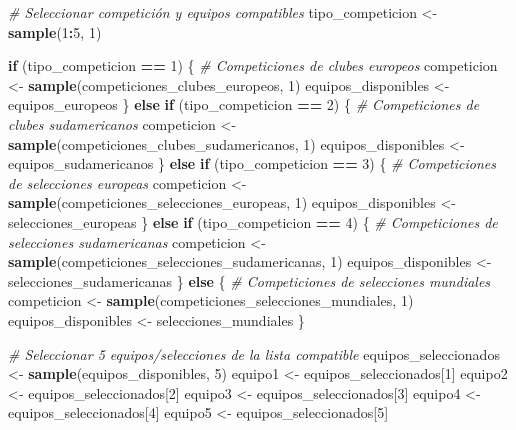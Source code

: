 \documentclass[
]{article}
\newenvironment{Shaded}{\begin{snugshade}}{\end{snugshade}}
\newcommand{\CommentTok}[1]{\textcolor[rgb]{0.56,0.35,0.01}{\textit{#1}}}
\newcommand{\ControlFlowTok}[1]{\textcolor[rgb]{0.13,0.29,0.53}{\textbf{#1}}}
\newcommand{\DecValTok}[1]{\textcolor[rgb]{0.00,0.00,0.81}{#1}}
\newcommand{\FunctionTok}[1]{\textcolor[rgb]{0.13,0.29,0.53}{\textbf{#1}}}
\newcommand{\NormalTok}[1]{#1}
\newcommand{\OtherTok}[1]{\textcolor[rgb]{0.56,0.35,0.01}{#1}}
\newcommand{\SpecialCharTok}[1]{\textcolor[rgb]{0.81,0.36,0.00}{\textbf{#1}}}
\begin{document}
\begin{Shaded}
\begin{Highlighting}[]
\CommentTok{\# Seleccionar competición y equipos compatibles}
\NormalTok{tipo\_competicion }\OtherTok{\textless{}{-}} \FunctionTok{sample}\NormalTok{(}\DecValTok{1}\SpecialCharTok{:}\DecValTok{5}\NormalTok{, }\DecValTok{1}\NormalTok{)}

\ControlFlowTok{if}\NormalTok{ (tipo\_competicion }\SpecialCharTok{==} \DecValTok{1}\NormalTok{) \{}
  \CommentTok{\# Competiciones de clubes europeos}
\NormalTok{  competicion }\OtherTok{\textless{}{-}} \FunctionTok{sample}\NormalTok{(competiciones\_clubes\_europeos, }\DecValTok{1}\NormalTok{)}
\NormalTok{  equipos\_disponibles }\OtherTok{\textless{}{-}}\NormalTok{ equipos\_europeos}
\NormalTok{\} }\ControlFlowTok{else} \ControlFlowTok{if}\NormalTok{ (tipo\_competicion }\SpecialCharTok{==} \DecValTok{2}\NormalTok{) \{}
  \CommentTok{\# Competiciones de clubes sudamericanos}
\NormalTok{  competicion }\OtherTok{\textless{}{-}} \FunctionTok{sample}\NormalTok{(competiciones\_clubes\_sudamericanos, }\DecValTok{1}\NormalTok{)}
\NormalTok{  equipos\_disponibles }\OtherTok{\textless{}{-}}\NormalTok{ equipos\_sudamericanos}
\NormalTok{\} }\ControlFlowTok{else} \ControlFlowTok{if}\NormalTok{ (tipo\_competicion }\SpecialCharTok{==} \DecValTok{3}\NormalTok{) \{}
  \CommentTok{\# Competiciones de selecciones europeas}
\NormalTok{  competicion }\OtherTok{\textless{}{-}} \FunctionTok{sample}\NormalTok{(competiciones\_selecciones\_europeas, }\DecValTok{1}\NormalTok{)}
\NormalTok{  equipos\_disponibles }\OtherTok{\textless{}{-}}\NormalTok{ selecciones\_europeas}
\NormalTok{\} }\ControlFlowTok{else} \ControlFlowTok{if}\NormalTok{ (tipo\_competicion }\SpecialCharTok{==} \DecValTok{4}\NormalTok{) \{}
  \CommentTok{\# Competiciones de selecciones sudamericanas}
\NormalTok{  competicion }\OtherTok{\textless{}{-}} \FunctionTok{sample}\NormalTok{(competiciones\_selecciones\_sudamericanas, }\DecValTok{1}\NormalTok{)}
\NormalTok{  equipos\_disponibles }\OtherTok{\textless{}{-}}\NormalTok{ selecciones\_sudamericanas}
\NormalTok{\} }\ControlFlowTok{else}\NormalTok{ \{}
  \CommentTok{\# Competiciones de selecciones mundiales}
\NormalTok{  competicion }\OtherTok{\textless{}{-}} \FunctionTok{sample}\NormalTok{(competiciones\_selecciones\_mundiales, }\DecValTok{1}\NormalTok{)}
\NormalTok{  equipos\_disponibles }\OtherTok{\textless{}{-}}\NormalTok{ selecciones\_mundiales}
\NormalTok{\}}

\CommentTok{\# Seleccionar 5 equipos/selecciones de la lista compatible}
\NormalTok{equipos\_seleccionados }\OtherTok{\textless{}{-}} \FunctionTok{sample}\NormalTok{(equipos\_disponibles, }\DecValTok{5}\NormalTok{)}
\NormalTok{equipo1 }\OtherTok{\textless{}{-}}\NormalTok{ equipos\_seleccionados[}\DecValTok{1}\NormalTok{]}
\NormalTok{equipo2 }\OtherTok{\textless{}{-}}\NormalTok{ equipos\_seleccionados[}\DecValTok{2}\NormalTok{]}
\NormalTok{equipo3 }\OtherTok{\textless{}{-}}\NormalTok{ equipos\_seleccionados[}\DecValTok{3}\NormalTok{]}
\NormalTok{equipo4 }\OtherTok{\textless{}{-}}\NormalTok{ equipos\_seleccionados[}\DecValTok{4}\NormalTok{]}
\NormalTok{equipo5 }\OtherTok{\textless{}{-}}\NormalTok{ equipos\_seleccionados[}\DecValTok{5}\NormalTok{]}


\end{Highlighting}
\end{Shaded}
\end{document}
